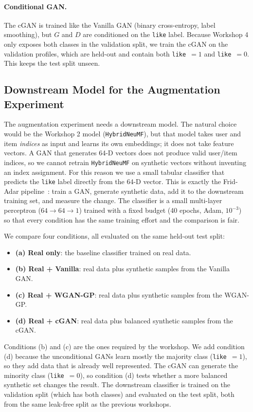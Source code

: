 \documentclass[10pt,twocolumn]{article}
\begin{document}
\paragraph{Conditional GAN.} The cGAN is trained like the Vanilla GAN (binary cross-entropy,
label smoothing), but $G$ and $D$ are conditioned on the \texttt{like} label. Because Workshop 4
only exposes both classes in the validation split, we train the cGAN on the validation profiles,
which are held-out and contain both \texttt{like}~$=1$ and \texttt{like}~$=0$. This keeps the
test split unseen.

\subsection{Downstream Model for the Augmentation Experiment}

The augmentation experiment needs a downstream model. The natural choice would be the Workshop 2
model (\texttt{HybridNeuMF}), but that model takes user and item \emph{indices} as input and
learns its own embeddings; it does not take feature vectors. A GAN that generates 64-D vectors
does not produce valid user/item indices, so we cannot retrain \texttt{HybridNeuMF} on synthetic
vectors without inventing an index assignment. For this reason we use a small tabular classifier
that predicts the \texttt{like} label directly from the 64-D vector. This is exactly the
Frid-Adar pipeline~\cite{fridadar2018}: train a GAN, generate synthetic data, add it to the
downstream training set, and measure the change. The classifier is a small multi-layer
perceptron ($64\rightarrow64\rightarrow1$) trained with a fixed budget (40 epochs, Adam,
$10^{-3}$) so that every condition has the same training effort and the comparison is fair.

We compare four conditions, all evaluated on the same held-out test split:
\begin{itemize}
\item \textbf{(a) Real only}: the baseline classifier trained on real data.
\item \textbf{(b) Real + Vanilla}: real data plus synthetic samples from the Vanilla GAN.
\item \textbf{(c) Real + WGAN-GP}: real data plus synthetic samples from the WGAN-GP.
\item \textbf{(d) Real + cGAN}: real data plus balanced synthetic samples from the cGAN.
\end{itemize}
Conditions (b) and (c) are the ones required by the workshop. We add condition (d) because the
unconditional GANs learn mostly the majority class (\texttt{like}~$=1$), so they add data that
is already well represented. The cGAN can generate the minority class (\texttt{like}~$=0$), so
condition (d) tests whether a more balanced synthetic set changes the result. The downstream
classifier is trained on the validation split (which has both classes) and evaluated on the test
split, both from the same leak-free split as the previous workshops.
\end{document}
